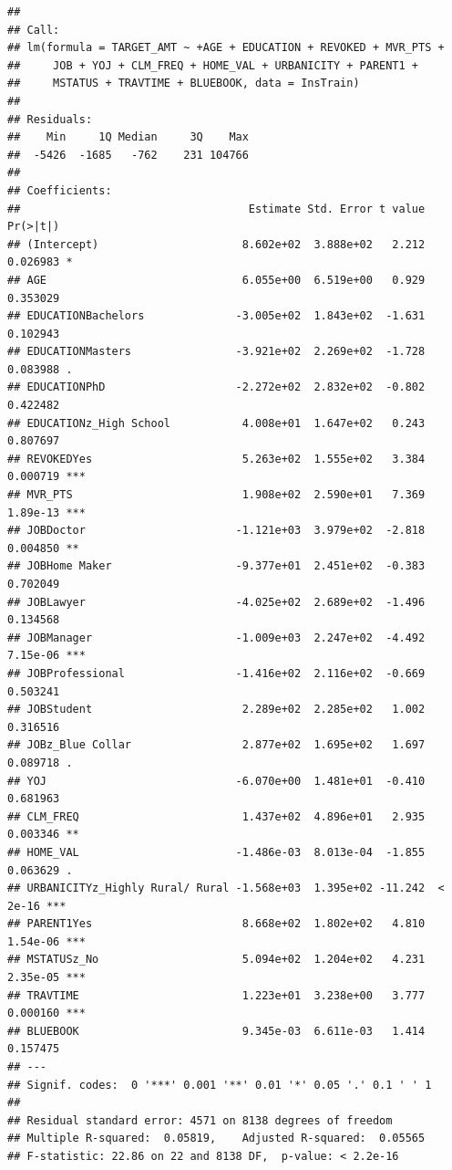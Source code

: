 \documentclass[]{article}
\begin{document}
\begin{verbatim}
## 
## Call:
## lm(formula = TARGET_AMT ~ +AGE + EDUCATION + REVOKED + MVR_PTS + 
##     JOB + YOJ + CLM_FREQ + HOME_VAL + URBANICITY + PARENT1 + 
##     MSTATUS + TRAVTIME + BLUEBOOK, data = InsTrain)
## 
## Residuals:
##    Min     1Q Median     3Q    Max 
##  -5426  -1685   -762    231 104766 
## 
## Coefficients:
##                                   Estimate Std. Error t value Pr(>|t|)    
## (Intercept)                      8.602e+02  3.888e+02   2.212 0.026983 *  
## AGE                              6.055e+00  6.519e+00   0.929 0.353029    
## EDUCATIONBachelors              -3.005e+02  1.843e+02  -1.631 0.102943    
## EDUCATIONMasters                -3.921e+02  2.269e+02  -1.728 0.083988 .  
## EDUCATIONPhD                    -2.272e+02  2.832e+02  -0.802 0.422482    
## EDUCATIONz_High School           4.008e+01  1.647e+02   0.243 0.807697    
## REVOKEDYes                       5.263e+02  1.555e+02   3.384 0.000719 ***
## MVR_PTS                          1.908e+02  2.590e+01   7.369 1.89e-13 ***
## JOBDoctor                       -1.121e+03  3.979e+02  -2.818 0.004850 ** 
## JOBHome Maker                   -9.377e+01  2.451e+02  -0.383 0.702049    
## JOBLawyer                       -4.025e+02  2.689e+02  -1.496 0.134568    
## JOBManager                      -1.009e+03  2.247e+02  -4.492 7.15e-06 ***
## JOBProfessional                 -1.416e+02  2.116e+02  -0.669 0.503241    
## JOBStudent                       2.289e+02  2.285e+02   1.002 0.316516    
## JOBz_Blue Collar                 2.877e+02  1.695e+02   1.697 0.089718 .  
## YOJ                             -6.070e+00  1.481e+01  -0.410 0.681963    
## CLM_FREQ                         1.437e+02  4.896e+01   2.935 0.003346 ** 
## HOME_VAL                        -1.486e-03  8.013e-04  -1.855 0.063629 .  
## URBANICITYz_Highly Rural/ Rural -1.568e+03  1.395e+02 -11.242  < 2e-16 ***
## PARENT1Yes                       8.668e+02  1.802e+02   4.810 1.54e-06 ***
## MSTATUSz_No                      5.094e+02  1.204e+02   4.231 2.35e-05 ***
## TRAVTIME                         1.223e+01  3.238e+00   3.777 0.000160 ***
## BLUEBOOK                         9.345e-03  6.611e-03   1.414 0.157475    
## ---
## Signif. codes:  0 '***' 0.001 '**' 0.01 '*' 0.05 '.' 0.1 ' ' 1
## 
## Residual standard error: 4571 on 8138 degrees of freedom
## Multiple R-squared:  0.05819,    Adjusted R-squared:  0.05565 
## F-statistic: 22.86 on 22 and 8138 DF,  p-value: < 2.2e-16
\end{verbatim}
\end{document}

